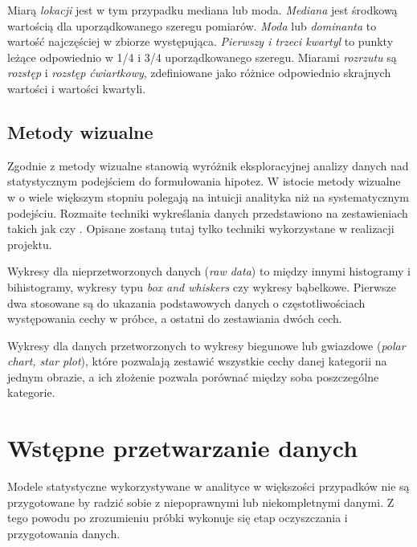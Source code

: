 \documentclass[12pt,a4paper,oneside]{report} %
\begin{document}
Miarą \emph{lokacji} jest w tym przypadku mediana lub moda. \emph{Mediana} jest środkową wartością dla uporządkowanego szeregu pomiarów. \emph{Moda} lub \emph{dominanta} to wartość najczęściej w zbiorze występująca. \emph{Pierwszy i trzeci kwartyl} to punkty leżące odpowiednio w 1/4 i 3/4 uporządkowanego szeregu. Miarami \emph{rozrzutu} są \emph{rozstęp} i \emph{rozstęp ćwiartkowy}, zdefiniowane jako różnice odpowiednio skrajnych wartości i wartości kwartyli. \par


\subsection{Metody wizualne}

Zgodnie z \cite{nist} metody wizualne stanowią wyróżnik eksploracyjnej analizy danych nad statystycznym podejściem do formułowania hipotez. W istocie metody wizualne w o wiele większym stopniu polegają na intuicji analityka niż na systematycznym podejściu. Rozmaite techniki wykreślania danych przedstawiono na zestawieniach takich jak \cite{visual-literacy} czy \cite{viz-catalogue}. Opisane zostaną tutaj tylko techniki wykorzystane w realizacji projektu. \par

Wykresy dla nieprzetworzonych danych (\emph{raw data}) to między innymi histogramy i bihistogramy, wykresy typu \emph{box and whiskers} czy wykresy bąbelkowe. Pierwsze dwa stosowane są do ukazania podstawowych danych o częstotliwościach występowania cechy w próbce, a ostatni do zestawiania dwóch cech. \par

Wykresy dla danych przetworzonych to wykresy biegunowe lub gwiazdowe (\emph{polar chart, star plot}), które pozwalają zestawić wszystkie cechy danej kategorii na jednym obrazie, a ich złożenie pozwala porównać między soba poszczególne kategorie. \par




\section{Wstępne przetwarzanie danych}

Modele statystyczne wykorzystywane w analityce w większości przypadków nie są przygotowane by radzić sobie z niepoprawnymi lub niekompletnymi danymi. Z tego powodu po zrozumieniu próbki wykonuje się etap oczyszczania i przygotowania danych. \par
\end{document}
